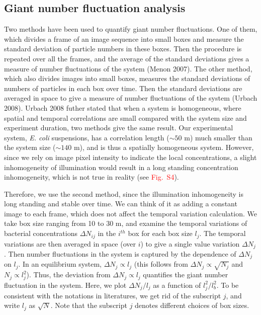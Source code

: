 \documentclass[twocolumn,aps,pre,amsmath,amssymb,longbibliography]{revtex4-1}
\begin{document}
\subsection{Giant number fluctuation analysis}\label{sec:method_gnf}
Two methods have been used to quantify giant number fluctuations. One of them, which divides a frame of an image sequence into small boxes and measure the standard deviation of particle numbers in these boxes. Then the procedure is repeated over all the frames, and the average of the standard deviations gives a measure of number fluctuations of the system (Menon 2007). The other method, which also divides images into small boxes, measures the standard deviations of numbers of particles in each box over time. Then the standard deviations are averaged in space to give a measure of number fluctuations of the system (Urbach 2008). Urbach 2008 futher stated that when a system is homogeneous, where spatial and temporal correlations are small compared with the system size and experiment duration, two methods give the same result. Our experimental system, \textit{E. coli} suspensions, has a correlation length ($\sim 50$ \textmu m) much smaller than the system size ($\sim 140$ \textmu m), and is thus a spatially homogeneous system. However, since we rely on image pixel intensity to indicate the local concentrations, a slight inhomogeneity of illumination would result in a long standing concentration inhomogeneity, which is not true in reality (see \textcolor{red}{Fig.~S4}).

Therefore, we use the second method, since the illumination inhomogeneity is long standing and stable over time. We can think of it as adding a constant image to each frame, which does not affect the temporal variation calculation. We take box size ranging from 10 to 30 \textmu m, and examine the temporal variations of bacterial concentrations $\Delta N_{ij}$ in the $i^{th}$ box for each box size $l_j$. The temporal variations are then averaged in space (over $i$) to give a single value variation $\Delta N_{j}$. Then number fluctuations in the system is captured by the dependence of $\Delta N_{j}$ on $l_j$. In an equilibrium system, $\Delta N_{j}\propto l_j$ (this follows from $\Delta N_{j}\propto \sqrt{N_j}$ and $N_j\propto l_j^2$). Thus, the deviation from $\Delta N_{j}\propto l_j$ quantifies the giant number fluctuation in the system. Here, we plot $\Delta N_{j}/l_j$ as a function of $l_j^2/l_b^2$. To be consistent with the notations in literatures, we get rid of the subscript $j$, and write $l_j$ as $\sqrt{N}$. Note that the subscript $j$ denotes different choices of box sizes.
\end{document}
